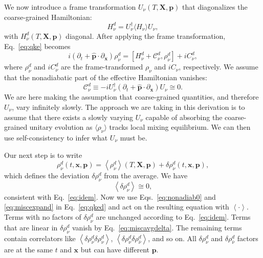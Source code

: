 \documentclass[aps,prd,twocolumn,groupedaddress,preprintnumbers]{revtex4-2}
\begin{document}
We now introduce a frame transformation $U_{\nu} (T, \boldsymbol{X}, \boldsymbol{p})$ that diagonalizes the coarse-grained Hamiltonian:
\begin{equation}
    H^d_{\nu} = U^\dagger_{\nu} \langle H_{\nu} \rangle U_{\nu},
\end{equation}
with $H^d_{\nu} (T, \boldsymbol{X}, \boldsymbol{p})$ diagonal. After applying the frame transformation, Eq.~\eqref{eq:qke} becomes
\begin{equation}
    i ( \partial_t + \boldsymbol{\hat{p}}\cdot\partial_{\boldsymbol{x}}) \rho^d_{\nu} = [ H^d_{\nu} + \mathcal{C}^d_{\nu}, \rho^d_{\nu}] + iC^d_{\nu}, \label{eq:qked}
\end{equation}
where $\rho^d_{\nu}$ and $iC^d_{\nu}$ are the frame-transformed $\rho_{\nu}$ and $iC_{\nu}$, respectively. We assume that the nonadiabatic part of the effective Hamiltonian vanishes:
\begin{equation}
    \mathcal{C}^d_{\nu} \equiv -i U_{\nu}^\dagger ( \partial_t + \boldsymbol{\hat{p}}\cdot\partial_{\bm{x}}) U_{\nu}  \cong 0. \label{eq:nonadiab0}
\end{equation}
We are here making the assumption that coarse-grained quantities, and therefore $U_{\nu}$, vary infinitely slowly. The approach we are taking in this derivation is to assume that there exists a slowly varying $U_{\nu}$ capable of absorbing the coarse-grained unitary evolution as $\langle \rho_{\nu} \rangle$ tracks local mixing equilibrium. We can then use self-consistency to infer what $U_{\nu}$ must be.

Our next step is to write
\begin{equation}
\rho^d_\nu (t, \boldsymbol{x}, \boldsymbol{p}) = \left\langle \rho^d_\nu \right\rangle (T, \boldsymbol{X}, \boldsymbol{p})  + \delta \rho^d_\nu (t, \boldsymbol{x}, \boldsymbol{p}), \label{eq:miscexpand}
\end{equation}
which defines the deviation $\delta \rho^d_\nu$ from the average. We have
\begin{equation}
\left\langle \delta \rho^d_\nu \right\rangle \cong 0, \label{eq:miscavgdelta}
\end{equation}
consistent with Eq.~\eqref{eq:idem}. Now we use Eqs.~\eqref{eq:nonadiab0} and \eqref{eq:miscexpand} in Eq.~\eqref{eq:qked} and act on the resulting equation with $\left\langle \cdot \right\rangle$. Terms with no factors of $\delta \rho^d_\nu$ are unchanged according to Eq.~\eqref{eq:idem}. Terms that are linear in $\delta \rho^d_\nu$ vanish by Eq.~\eqref{eq:miscavgdelta}. The remaining terms contain correlators like $\left\langle \delta \rho^d_\nu \delta \rho^d_\nu \right\rangle$, $\left\langle \delta \rho^d_\nu \delta \rho^d_{\bar{\nu}} \right\rangle$, and so on. All $\delta \rho^d_\nu$ and $\delta \rho^d_{\bar{\nu}}$ factors are at the same $t$ and $\boldsymbol{x}$ but can have different $\boldsymbol{p}$.
\end{document}
